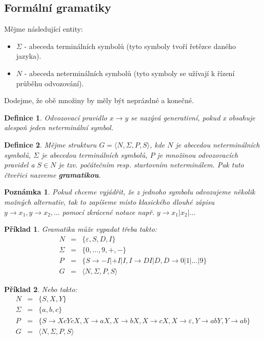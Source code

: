\documentclass[10pt, a4paper, titlepage]{article}
\theoremstyle{note}
\newtheorem{definice}{\textbf{Definice}}
\newtheorem{priklad}{\textbf{Příklad}}
\newtheorem{poznamka}{\textbf{Poznámka}}
\begin{document}
\subsection{Formální gramatiky}
Mějme následující entity:
\begin{itemize}
\item $\Sigma$ - abeceda terminálních symbolů (tyto symboly tvoří řetězce daného jazyka).
\item $N$ - abeceda neterminálních symbolů (tyto symboly se užívají k řízení průběhu odvozování).
\end{itemize}

Dodejme, že obě množiny by měly být neprázdné a konečné.

\begin{definice}
Odvozovací pravidlo $x \rightarrow y$ se nazývá \emph{generativní}, pokud \emph{x} obsahuje alespoň jeden neterminální symbol.
\end{definice}

\begin{definice}
Mějme strukturu $G = \langle N, \Sigma, P, S \rangle$, kde $N$ je abecedou neterminálních symbolů, $\Sigma$ je abecedou terminálních symbolů,
$P$ je množinou odvozovacích pravidel a $S \in N$ je tzv. \emph{počátečním} resp. \emph{startovním} neterminálem. Pak tuto čtveřici nazveme \textbf{gramatikou}.
\end{definice}

\begin{poznamka}
Pokud chceme vyjádřit, že z jednoho symbolu odvozujeme několik možných alternativ, tak to zapíšeme místo klasického dlouhé zápisu
$y \rightarrow x_{1}, y \rightarrow x_{2}, \ldots$ pomocí zkrácené notace např. $y \rightarrow x_{1}|x_{2}|\ldots$
\end{poznamka}

\begin{priklad}
Gramatika může vypadat třeba takto:
\begin{eqnarray*}
N &=& \lbrace \varepsilon, S, D, I \rbrace \\
\Sigma &=& \lbrace 0, \ldots, 9, +, - \rbrace \\
P &=& \lbrace S \rightarrow -I|+I|I, I \rightarrow DI|D, D \rightarrow 0|1|\ldots |9 \rbrace \\
G &=& \langle N, \Sigma, P, S \rangle
\end{eqnarray*}
\end{priklad}

\begin{priklad}\label{priklad-2}
Nebo takto:
\begin{eqnarray*}
N &=& \lbrace S, X, Y \rbrace \\
\Sigma &=& \lbrace a, b, c \rbrace \\
P &=& \lbrace S \rightarrow XcYcX, X \rightarrow aX, X \rightarrow bX, X \rightarrow cX, X \rightarrow \varepsilon,
Y \rightarrow abY, Y \rightarrow ab \rbrace \\
G &=& \langle N, \Sigma, P, S \rangle
\end{eqnarray*}
\end{priklad}
\end{document}
